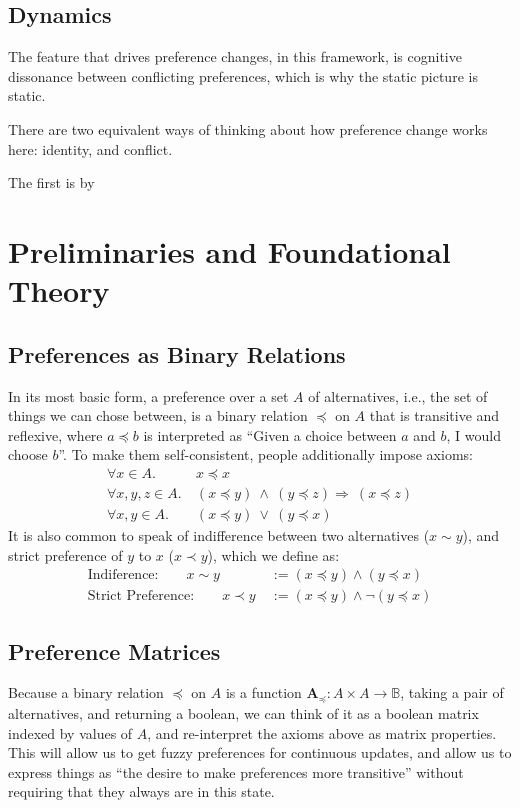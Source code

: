 \documentclass{article}
\theoremstyle{plain}
\theoremstyle{definition}
\theoremstyle{remark}
\newcommand\leqc{\preccurlyeq}
\newcommand\mat[1]{\mathbf #1}
\begin{document}
	
	\subsection{Dynamics}
	The feature that drives preference changes, in this framework, is cognitive dissonance between conflicting preferences, which is why the static picture is static.
	
	There are two equivalent ways of thinking about how preference change works here: identity, and conflict.
	
	The first is by 
	
	\section{Preliminaries and Foundational Theory}
	\subsection{Preferences as Binary Relations}
	In its most basic form, a preference over a set $A$ of alternatives, i.e., the set of things we can chose between, is a binary relation $\leqc$ on $A$ that is transitive and reflexive, where $a \leqc b$ is interpreted as ``Given a choice between $a$ and $b$, I would choose $b$''. To make them self-consistent, people additionally impose axioms:
	\begin{align*}
	\forall x \in A.&~x \leqc x \tag{Reflexivity}\\
	\forall x,y,z \in A.&~(x\leqc y)~\land~( y \leqc z) \Rightarrow~(x \leqc z) \tag{Transitivity}\\
	\forall x, y \in A. &~ (x\leqc y)~\lor~( y \leqc x) \tag{Completeness}
	\end{align*}
	It is also common to speak of indifference between two alternatives ($x \sim y$), and strict preference of $y$ to $x$ ($x \prec y$), which we define as:
	\begin{align*}
		\text{Indiference:}\qquad x \sim y &~:= (x \leqc y) \land (y \leqc x)\\
		\text{Strict Preference:}\qquad x \prec y &~:= (x \leqc y) \land \lnot (y \leqc x)
	\end{align*}
	
	\subsection{Preference Matrices}
	Because a binary relation $\leqc$ on $A$ is a function $\mat A_\leqc: A \times A \to \mathbb{B}$, taking a pair of alternatives, and returning a boolean, we can think of it as a boolean matrix indexed by values of $A$, and re-interpret the axioms above as matrix properties. This will allow us to get fuzzy preferences for continuous updates, and allow us to express things as ``the desire to make preferences more transitive'' without requiring that they always are in this state. 
	
\end{document}

